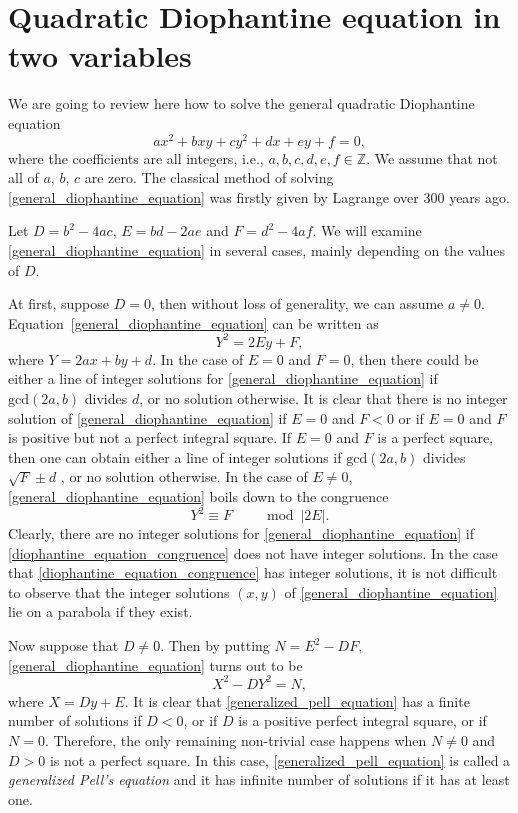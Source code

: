 \documentclass[pdftex]{sigma}
\numberwithin{equation}{section}
\begin{document}
\appendix
\section{Quadratic Diophantine equation in two variables}
\label{appendix_QDE}
We are going to review here how to solve the general quadratic Diophantine equation
\begin{equation}\label{general_diophantine_equation}
	ax^2+bxy+cy^2+dx+ey+f=0,
\end{equation}
where the coefficients are all integers, i.e., $ a,b,c,d,e,f\in \mathbb{Z} $. We assume that not all of $ a$, $b$, $c $ are zero. The classical method of solving \eqref{general_diophantine_equation} was firstly given by Lagrange over 300 years ago.

Let $ D=b^2-4ac$, $E=bd-2ae $ and $ F=d^2-4af $. We will examine \eqref{general_diophantine_equation} in several cases, mainly depending on the values of $ D $.

At first, suppose $ D=0 $, then without loss of generality, we can assume $ a\neq 0 $. Equation~\eqref{general_diophantine_equation} can be written as
\begin{equation*}
	Y^2=2Ey+F,
\end{equation*}
where $ Y=2ax+by+d $. In the case of $ E=0 $ and $ F=0 $, then there could be either a line of integer solutions for \eqref{general_diophantine_equation} if $ \text{gcd}(2a,b) $ divides $ d $, or no solution otherwise. It is clear that there is no integer solution of \eqref{general_diophantine_equation} if $ E=0 $ and $ F<0 $ or if $ E=0 $ and $ F $ is positive but not a perfect integral square. If $ E=0 $ and $ F $ is a perfect square, then one can obtain either a line of integer solutions if $ \text{gcd}(2a,b) $ divides $ \sqrt{F}\pm d $ , or no solution otherwise. In the case of $ E\neq 0 $, \eqref{general_diophantine_equation} boils down to the congruence
\begin{equation}\label{diophantine_equation_congruence}
	Y^2 \equiv F \qquad \bmod  |2E|.
\end{equation}
Clearly, there are no integer solutions for \eqref{general_diophantine_equation} if \eqref{diophantine_equation_congruence} does not have integer solutions. In the case that \eqref{diophantine_equation_congruence} has integer solutions, it is not difficult to observe that the integer solutions $ (x,y) $ of \eqref{general_diophantine_equation} lie on a parabola if they exist.

Now suppose that $ D\neq0 $. Then by putting $ N=E^2-DF $, \eqref{general_diophantine_equation} turns out to be
\begin{equation}\label{generalized_pell_equation}
	X^2-DY^2=N,
\end{equation}
where $ X=Dy+E $. It is clear that \eqref{generalized_pell_equation} has a finite number of solutions if $ D<0 $, or if $ D $ is a positive perfect integral square, or if $ N=0 $. Therefore, the only remaining non-trivial case happens when $ N\neq0 $ and $ D>0 $ is not a perfect square. In this case, \eqref{generalized_pell_equation} is called a \textit{generalized Pell's equation} and it has infinite number of solutions if it has at least one.
\end{document}

